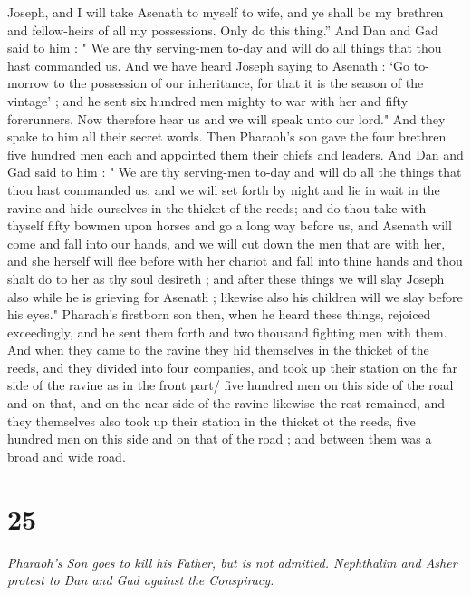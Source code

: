 Joseph, and I will take Asenath to myself to wife, and ye shall be my brethren and fellow-heirs of all my possessions. Only do this thing.” And Dan and Gad said to him : " We are thy serving-men to-day and will do all things that thou hast commanded us. And we have heard Joseph saying to Asenath : ‘Go to-morrow to the possession of our inheritance, for that it is the season of the vintage’ ; and he sent six hundred men mighty to war with her and fifty forerunners. Now therefore hear us and we will speak unto our lord." And they spake to him all their secret words. Then Pharaoh's son gave the four brethren five hundred men each and appointed them their chiefs and leaders. And Dan and Gad said to him : " We are thy serving-men to-day and will do all the things that thou hast commanded us, and we will set forth by night and lie in wait in the ravine and hide ourselves in the thicket of the reeds; and do thou take with thyself fifty bowmen upon horses and go a long way before us, and Asenath will come and fall into our hands, and we will cut down the men that are with her, and she herself will flee before with her chariot and fall into thine hands and thou shalt do to her as thy soul desireth ; and after these things we will slay Joseph also while he is grieving for Asenath ; likewise also his children will we slay before his eyes." Pharaoh's firstborn son then, when he heard these things, rejoiced exceedingly, and he sent them forth and two thousand fighting men with them. And when they came to the ravine they hid themselves in the thicket of the reeds, and they divided into four companies, and took up their station on the far side of the ravine as in the front part/ five hundred men on this side of the road and on that, and on the near side of the ravine likewise the rest remained, and they themselves also took up their station in the thicket ot the reeds, five hundred men on this side and on that of the road ; and between them was a broad and wide road. 


\chapter{25}

\par \textit{Pharaoh's Son goes to kill his Father, but is not admitted. Nephthalim and Asher protest to Dan and Gad against the Conspiracy.}



